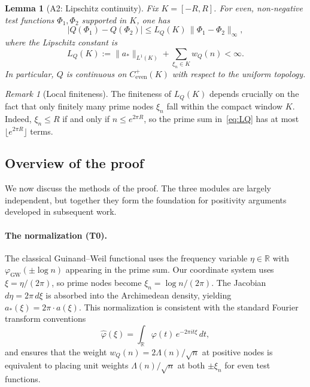 \documentclass[11pt,a4paper]{article}
\newtheorem{lemma}[theorem]{Lemma}
\theoremstyle{definition}
\theoremstyle{remark}
\newtheorem{remark}[theorem]{Remark}
\newcommand{\R}{\mathbb{R}}
\begin{document}
\begin{lemma}[A2: Lipschitz continuity]\label{lem:A2}
Fix $K = [-R, R]$. For even, non-negative test functions $\Phi_1, \Phi_2$ supported in $K$, one has
\begin{equation}\label{eq:A2-Lip}
  |Q(\Phi_1) - Q(\Phi_2)| \leq L_Q(K)\, \|\Phi_1 - \Phi_2\|_\infty,
\end{equation}
where the Lipschitz constant is
\begin{equation}\label{eq:LQ}
  L_Q(K) := \|a_*\|_{L^1(K)} + \sum_{\xi_n \in K} w_Q(n) < \infty.
\end{equation}
In particular, $Q$ is continuous on $C^+_{\mathrm{even}}(K)$ with respect to the uniform topology.
\end{lemma}

\begin{remark}[Local finiteness]\label{rem:local-finite}
The finiteness of $L_Q(K)$ depends crucially on the fact that only finitely many prime nodes $\xi_n$ fall within the compact window $K$. Indeed, $\xi_n \leq R$ if and only if $n \leq e^{2\pi R}$, so the prime sum in~\eqref{eq:LQ} has at most $\lfloor e^{2\pi R} \rfloor$ terms.
\end{remark}

\subsection{Overview of the proof}

We now discuss the methods of the proof. The three modules are largely independent, but together they form the foundation for positivity arguments developed in subsequent work.

\paragraph{The normalization (T0).}
The classical Guinand--Weil functional uses the frequency variable $\eta \in \R$ with $\varphi_{\mathrm{GW}}(\pm \log n)$ appearing in the prime sum. Our coordinate system uses $\xi = \eta/(2\pi)$, so prime nodes become $\xi_n = \log n/(2\pi)$. The Jacobian $d\eta = 2\pi\, d\xi$ is absorbed into the Archimedean density, yielding $a_*(\xi) = 2\pi \cdot a(\xi)$. This normalization is consistent with the standard Fourier transform conventions
\[
  \widehat{\varphi}(\xi) = \int_\R \varphi(t)\, e^{-2\pi i t\xi}\, dt,
\]
and ensures that the weight $w_Q(n) = 2\Lambda(n)/\sqrt{n}$ at positive nodes is equivalent to placing unit weights $\Lambda(n)/\sqrt{n}$ at both $\pm\xi_n$ for even test functions.
\end{document}
